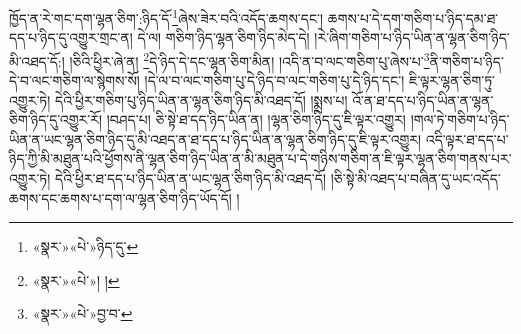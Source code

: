 ཁྱོད་ན་རེ་གང་དག་ལྷན་ཅིག་:ཉིད་དོ་\footnote{«སྣར་»«པེ་»ཉིད་དུ་}ཞེས་ཟེར་བའི་འདོད་ཆགས་དང་། ཆགས་པ་དེ་དག་གཅིག་པ་ཉིད་དམ་ཐ་དད་པ་ཉིད་དུ་འགྱུར་གྲང་ན། དེ་ལ། གཅིག་ཉིད་ལྷན་ཅིག་ཉིད་མེད་དེ། །རེ་ཞིག་གཅིག་པ་ཉིད་ཡིན་ན་ལྷན་ཅིག་ཉིད་མི་འཐད་དོ:། །ཅིའི་ཕྱིར་ཞེ་ན། \footnote{«སྣར་»«པེ་»། ། }དེ་ཉིད་དེ་དང་ལྷན་ཅིག་མིན། །འདི་ན་བ་ལང་གཅིག་པུ་ཞེས་པ་\footnote{«སྣར་»«པེ་»བྱ་བ་}ནི་གཅིག་པ་ཉིད་དེ་བ་ལང་གཅིག་ལ་སྙེགས་སོ། །དེ་ལ་བ་ལང་གཅིག་པུ་དེ་ཉིད་བ་ལང་གཅིག་པུ་དེ་ཉིད་དང་། ཇི་ལྟར་ལྷན་ཅིག་ཏུ་འགྱུར་ཏེ། དེའི་ཕྱིར་གཅིག་པུ་ཉིད་ཡིན་ན་ལྷན་ཅིག་ཉིད་མི་འཐད་དོ། །སྨྲས་པ། འོ་ན་ཐ་དད་པ་ཉིད་ཡིན་ན་ལྷན་ཅིག་ཉིད་དུ་འགྱུར་རོ། །བཤད་པ། ཅི་སྟེ་ཐ་དད་ཉིད་ཡིན་ན། །ལྷན་ཅིག་ཉིད་དུ་ཇི་ལྟར་འགྱུར། །གལ་ཏེ་གཅིག་པ་ཉིད་ཡིན་ན་ཡང་ལྷན་ཅིག་ཉིད་དུ་མི་འཐད་ན་ཐ་དད་པ་ཉིད་ཡིན་ན་ལྷན་ཅིག་ཉིད་དུ་ཇི་ལྟར་འགྱུར། འདི་ལྟར་ཐ་དད་པ་ཉིད་ཀྱི་མི་མཐུན་པའི་ཕྱོགས་ནི་ལྷན་ཅིག་ཉིད་ཡིན་ན་མི་མཐུན་པ་དེ་གཉིས་གཅིག་ན་ཇི་ལྟར་ལྷན་ཅིག་གནས་པར་འགྱུར་ཏེ། དེའི་ཕྱིར་ཐ་དད་པ་ཉིད་ཡིན་ན་ཡང་ལྷན་ཅིག་ཉིད་མི་འཐད་དོ། །ཅི་སྟེ་མི་འཐད་པ་བཞིན་དུ་ཡང་འདོད་ཆགས་དང་ཆགས་པ་དག་ལ་ལྷན་ཅིག་ཉིད་ཡོད་དོ། །
